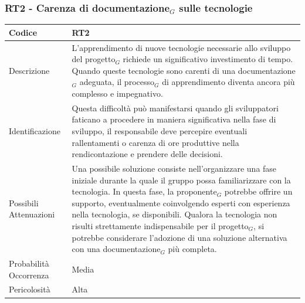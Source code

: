 \documentclass[10pt]{article}
\begin{document}
{    \subsubsection{RT2 - Carenza di documentazione$_G$ sulle tecnologie}
    \label{RT2}
    \begin{tabularx}{\textwidth}{|l|X|}
    \hline
    \rowcolor{gray!25}
    Codice & RT2 \\
    \hline
    Descrizione & L'apprendimento di nuove tecnologie necessarie allo sviluppo del progetto$_G$ richiede un significativo investimento di tempo. Quando queste tecnologie sono carenti di una documentazione$_G$ adeguata, il processo$_G$ di apprendimento diventa ancora più complesso e impegnativo.\\
    \hline
    Identificazione & Questa difficoltà può manifestarsi quando gli sviluppatori faticano a procedere in maniera significativa nella fase di sviluppo, il responsabile deve percepire eventuali rallentamenti o carenza di ore produttive nella rendicontazione e prendere delle decisioni.  \\
    \hline
    Possibili Attenuazioni & Una possibile soluzione consiste nell'organizzare una fase iniziale durante la quale il gruppo possa familiarizzare con la tecnologia. In questa fase, la proponente$_G$ potrebbe offrire un supporto, eventualmente coinvolgendo esperti con esperienza nella tecnologia, se disponibili. Qualora la tecnologia non risulti strettamente indispensabile per il progetto$_G$, si potrebbe considerare l'adozione di una soluzione alternativa con una documentazione$_G$ più completa.\\
    \hline
    Probabilità Occorrenza & Media \\
    \hline
    Pericolosità & Alta \\ 
    \hline
    \end{tabularx}

}
\end{document}
